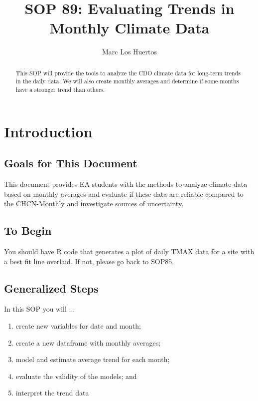 \documentclass{article}\usepackage[]{graphicx}\usepackage[]{color}
\title{SOP 89: Evaluating Trends in Monthly Climate Data}
\author{Marc Los Huertos}
\begin{document}
\maketitle
\tableofcontents

\begin{abstract}
\noindent This SOP will provide the tools to analyze the CDO climate data for long-term trends in the daily data. We will also create monthly averages and determine if some months have a stronger trend than others.   

\end{abstract}


\section{Introduction}

\subsection{Goals for This Document}

This document provides EA students with the methods to analyze climate data based on monthly averages and evaluate if these data are reliable compared to the CHCN-Monthly and investigate sources of uncertainty. 

\subsection{To Begin}

You should have R code that generates a plot of daily TMAX data for a site with a best fit line overlaid. If not, please go back to SOP85.


\subsection{Generalized Steps}

In this SOP you will ...

\begin{enumerate}
  \item create new variables for date and month;
  \item create a new dataframe with monthly averages;
  \item model and estimate average trend for each month;
  \item evaluate the validity of the models; and
  \item interpret the trend data
\end{enumerate}
\end{document}
